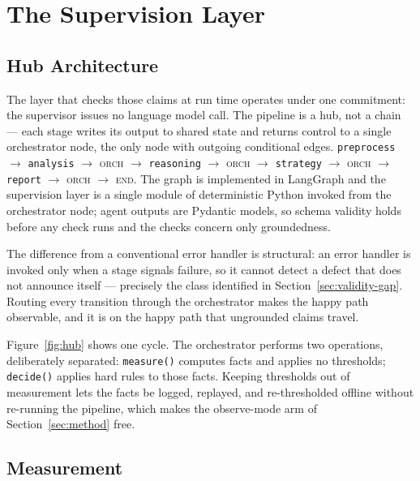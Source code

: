 \documentclass[runningheads]{llncs}
\begin{document}
\section{The Supervision Layer}
\label{sec:supervision}

\subsection{Hub Architecture}
\label{sec:hub}

The layer that checks those claims at run time operates under one commitment: the
supervisor issues no language model call. The pipeline is a hub, not a chain ---
each stage writes its output to shared state and returns control to a single
orchestrator node, the only node with outgoing conditional edges.
\texttt{preprocess} $\rightarrow$ \texttt{analysis} $\rightarrow$ \textsc{orch}
$\rightarrow$ \texttt{reasoning} $\rightarrow$ \textsc{orch} $\rightarrow$
\texttt{strategy} $\rightarrow$ \textsc{orch} $\rightarrow$ \texttt{report}
$\rightarrow$ \textsc{orch} $\rightarrow$ \textsc{end}. The graph is implemented
in LangGraph and the supervision layer is a single module of deterministic Python
invoked from the orchestrator node; agent outputs are Pydantic models, so schema
validity holds before any check runs and the checks concern only groundedness.

The difference from a conventional error handler is structural: an error handler
is invoked only when a stage signals failure, so it cannot detect a defect that
does not announce itself --- precisely the class identified in
Section~\ref{sec:validity-gap}. Routing every transition through the orchestrator
makes the happy path observable, and it is on the happy path that ungrounded
claims travel.

Figure~\ref{fig:hub} shows one cycle. The orchestrator performs two operations,
deliberately separated: \texttt{measure()} computes facts and applies no
thresholds; \texttt{decide()} applies hard rules to those facts. Keeping
thresholds out of measurement lets the facts be logged, replayed, and
re-thresholded offline without re-running the pipeline, which makes the
observe-mode arm of Section~\ref{sec:method} free.

\subsection{Measurement}
\label{sec:measure}
\end{document}
